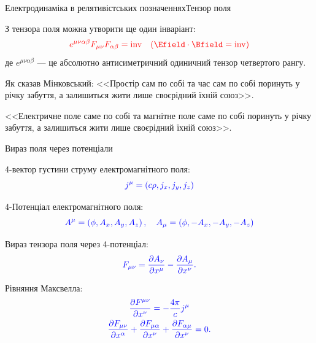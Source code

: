 \documentclass[]{beamer}
\begin{document}
\begin{frame}{Електродинаміка в релятивістських позначеннях}{Тензор поля}
\begin{overprint}
	З тензора поля можна утворити ще один інваріант:
	\begin{equation*}\color{red}
		e^{\mu\nu\alpha\beta}F_{\mu\nu}F_{\alpha\beta} = \mathrm{inv}  \quad (\Efield\cdot\Bfield = \mathrm{inv})
	\end{equation*}
	де $  e^{\mu\nu\alpha\beta}$ --- це абсолютно антисиметричний одиничний тензор четвертого рангу.
	\onslide<2>
	\begin{block}{}
		Як сказав Мінковський: <<Простір сам по собі та час сам по собі поринуть у річку забуття, а залишиться жити лише своєрідний їхній союз>>.
	\end{block}
	\begin{block}{}
		<<Електричне поле саме по собі та магнітне поле саме по собі поринуть у річку забуття, а залишиться жити лише своєрідний їхній союз>>.
	\end{block}

\end{overprint}


\end{frame}





\begin{frame}{Вираз поля через потенціали}{}

	4-вектор густини струму електромагнітного поля:
	\begin{equation*}\color{blue}
		j^{\mu} = \left( c\rho, {j}_x, {j}_y, {j}_z \right)
	\end{equation*}

	4-Потенціал електромагнітного поля:
	\begin{equation*}\color{blue}
		A^{\mu} = \left( \phi, {A}_x, {A}_y, {A}_z \right), \quad A_{\mu} = \left( \phi, -{A}_x, -{A}_y, -{A}_z \right)
	\end{equation*}

	Вираз тензора поля через 4-потенціал:
	\begin{equation*}\color{blue}
		F_{\mu\nu} = \frac{\partial A_{\nu}}{\partial x^{\mu}} - \frac{\partial A_{\mu}}{\partial x^{\nu}}.
	\end{equation*}

	Рівняння Максвелла:
	\begin{gather*}\color{blue}
		\frac{\partial F^{\mu\nu}}{\partial x^\nu} =                                                                                -\frac{4\pi}{c}j^\mu \\
		\color{blue}
		\frac{\partial F_{\mu\nu}}{\partial x^\alpha} + \frac{\partial F_{\mu\alpha}}{\partial x^\nu} +\frac{\partial F_{\alpha\mu}}{\partial x^\nu}  = 0.
	\end{gather*}

\end{frame}
\end{document}
